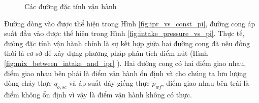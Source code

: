 \documentclass[12pt,a4paper]{report}
\begin{document}
	\begin{figure}[h]
		\centering
		\hfill
		\hfill
		\caption[Các đường đặc tính vận hành]{Các đường đặc tính vận hành \cite{jansen2004modelling}}
	\end{figure}
\newline
Đường dòng vào được thể hiện trong Hình \ref{fig:ipr_vs_const_pi}, đường cong áp suất đầu vào được thể hiện trong Hình \ref{fig:intake_pressure_vs_pi}. Thực tế, đường đặc tính vận hành chính là sự kết hợp giữa hai đường cong đã nêu đồng thời là cơ sở để xây dựng phương pháp phân tích điểm nút (Hình \ref{fig:mix_between_intake_and_ipr} \cite{jansen2004modelling}). Hai đường cong có hai điểm giao nhau, điểm giao nhau bên phải là
điểm vận hành ổn định và cho chúng ta lưu lượng dòng chảy thực $q_{o,sc}$ và áp suất đáy giếng thực $p_{wf}$, điểm giao nhau bên trái là điểm không ổn định vì vậy là điểm vận hành không có thực.
\end{document}
